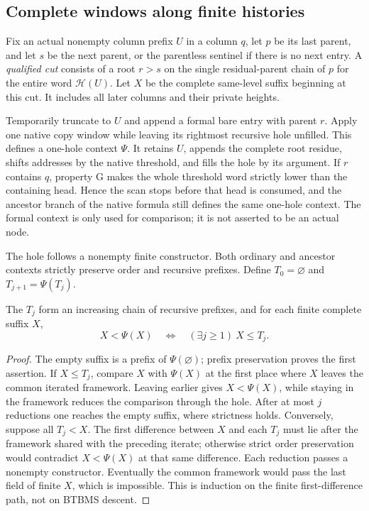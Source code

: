 \subsection{Complete windows along finite histories}\label{sec:complete-windows}
Fix an actual nonempty column prefix $U$ in a column $q$, let $p$ be
its last parent, and let $s$ be the next parent, or the parentless
sentinel if there is no next entry. A \emph{qualified cut} consists of
a root $r>s$ on the single residual-parent chain of $p$ for the entire
word $\mathcal H(U)$. Let $X$ be the complete same-level suffix beginning
at this cut. It includes all later columns and their private heights.

Temporarily truncate to $U$ and append a formal bare entry with parent
$r$. Apply one native copy window while leaving its rightmost recursive
hole unfilled. This defines a one-hole context $\Psi$. It retains $U$,
appends the complete root residue, shifts addresses by the native
threshold, and fills the hole by its argument. If $r$ contains $q$,
property G makes the whole threshold word strictly lower than the
containing head. Hence the scan stops before that head is consumed,
and the ancestor branch of the native formula still defines the same
one-hole context. The formal context is only used for comparison; it
is not asserted to be an actual node.

The hole follows a nonempty finite constructor. Both ordinary and
ancestor contexts strictly preserve order and recursive prefixes.
Define $T_0=\varnothing$ and $T_{j+1}=\Psi(T_j)$.

\begin{lemma}\label{lem:context}
The $T_j$ form an increasing chain of recursive prefixes, and for each
finite complete suffix $X$,
\begin{equation}\label{eq:3-3}
       X<\Psi(X)\quad\Longleftrightarrow\quad
       (\exists j\ge1)\ X\le T_j.                    
\end{equation}
\end{lemma}
\begin{proof}
The empty suffix is a prefix of $\Psi(\varnothing)$; prefix preservation
proves the first assertion. If $X\le T_j$, compare $X$ with $\Psi(X)$
at the first place where $X$ leaves the common iterated framework.
Leaving earlier gives $X<\Psi(X)$, while staying in the framework
reduces the comparison through the hole. After at most $j$ reductions
one reaches the empty suffix, where strictness holds. Conversely,
suppose all $T_j<X$. The first difference between $X$ and each $T_j$
must lie after the framework shared with the preceding iterate; otherwise
strict order preservation would contradict $X<\Psi(X)$ at that same
difference. Each reduction passes a nonempty constructor. Eventually
the common framework would pass the last field of finite $X$, which
is impossible. This is induction on the finite first-difference path,
not on BTBMS descent.
\end{proof}

